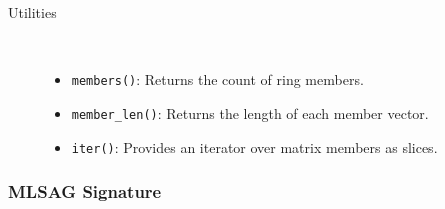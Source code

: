 \documentclass[12pt,a4paper]{article}
\begin{document}
\begin{description}
\item[Utilities] \hfill \\
\begin{itemize}
  \item \texttt{members()}: Returns the count of ring members.
  \item \texttt{member\_len()}: Returns the length of each member vector.
  \item \texttt{iter()}: Provides an iterator over matrix members as slices.
\end{itemize}
\end{description}

\subsubsection{MLSAG Signature}
\label{subsubsec:mlsag-signature}
\end{document}
